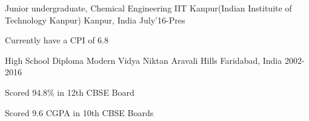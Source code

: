 \begin{cventries}
  \cventry
    {Junior undergraduate, Chemical Engineering}
    {IIT Kanpur(Indian Instituite of Technology Kanpur)}
    {Kanpur, India}
    {July'16-Pres}
    {
      \begin{cvitems}
        \item {Currently have a CPI of 6.8}
      \end{cvitems}
    }

  \cventry
    {High School Diploma}
    {Modern Vidya Niktan Aravali Hills}
    {Faridabad, India}
    {2002-2016}
    {
      \begin{cvitems}
        \item {Scored 94.8\% in 12th CBSE Board}
        \item {Scored 9.6 CGPA in 10th CBSE Boards}
      \end{cvitems}
    }    
\end{cventries}
